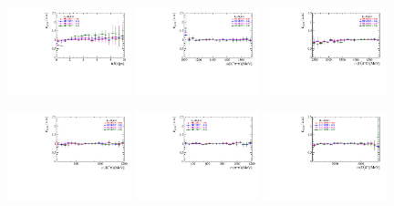 \begin{figure}[h]
\includegraphics[height=!,width=0.32\textwidth]{figs/dataVsMC/signal_bdt_scan/eff_Ds2KKpi_1_Bs_DTF_TAU.pdf}
\includegraphics[height=!,width=0.32\textwidth]{figs/dataVsMC/signal_bdt_scan/eff_Ds2KKpi_1_m_Kpipi.pdf}
\includegraphics[height=!,width=0.32\textwidth]{figs/dataVsMC/signal_bdt_scan/eff_Ds2KKpi_1_m_Dspipi.pdf}

\includegraphics[height=!,width=0.32\textwidth]{figs/dataVsMC/signal_bdt_scan/eff_Ds2KKpi_1_m_Kpi.pdf}
\includegraphics[height=!,width=0.32\textwidth]{figs/dataVsMC/signal_bdt_scan/eff_Ds2KKpi_1_m_pipi.pdf}
\includegraphics[height=!,width=0.32\textwidth]{figs/dataVsMC/signal_bdt_scan/eff_Ds2KKpi_1_m_Dspi.pdf}
\caption{}
\label{fig:}
\end{figure}


